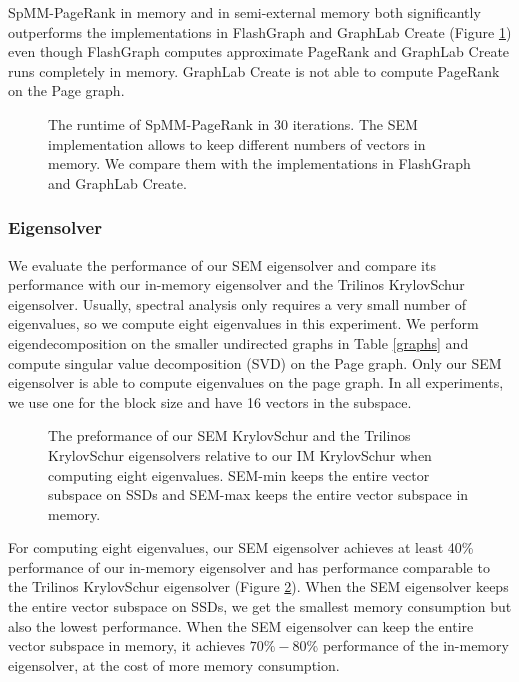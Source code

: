 SpMM-PageRank in memory and in semi-external memory both significantly outperforms
the implementations in FlashGraph and GraphLab Create (Figure \ref{perf:pagerank})
even though FlashGraph computes approximate PageRank and GraphLab Create runs
completely in memory. GraphLab Create is not able to compute PageRank on the Page
graph.


\begin{figure}
	\begin{center}
		\footnotesize
		
		\caption{The runtime of SpMM-PageRank in 30 iterations. The SEM
			implementation allows to keep different numbers of vectors in memory.
			We compare them with the implementations in FlashGraph and GraphLab
		Create.}
		\label{perf:pagerank}
	\end{center}
\end{figure}

\subsubsection{Eigensolver}

We evaluate the performance of our SEM eigensolver and compare its performance
with our in-memory eigensolver and the Trilinos KrylovSchur eigensolver.
Usually, spectral analysis \cite{} only requires a very small number of
eigenvalues, so we compute eight eigenvalues in this experiment. We perform
eigendecomposition on the smaller undirected graphs
in Table \ref{graphs} and compute singular value decomposition (SVD) on
the Page graph. Only our SEM eigensolver is able to compute eigenvalues
on the page graph. In all experiments, we use one for the block size and
have 16 vectors in the subspace.

\begin{figure}
	\begin{center}
		\footnotesize
		
		\caption{The preformance of our SEM KrylovSchur and the Trilinos KrylovSchur
			eigensolvers relative to our IM KrylovSchur when computing eight
			eigenvalues. SEM-min keeps the entire vector subspace on SSDs and
		SEM-max keeps the entire vector subspace in memory.}
		\label{fig:eigen}
	\end{center}
\end{figure}

For computing eight eigenvalues, our SEM eigensolver achieves at least 40\%
performance of our in-memory eigensolver and has performance comparable to
the Trilinos KrylovSchur eigensolver (Figure \ref{fig:eigen}). When the SEM
eigensolver keeps the entire vector subspace on SSDs, we get the smallest
memory consumption but also the lowest performance. When the SEM eigensolver
can keep the entire vector subspace in memory, it achieves $70\%-80\%$
performance of the in-memory eigensolver, at the cost of more memory consumption.

